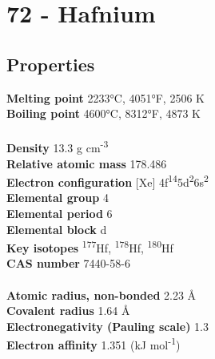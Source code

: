 \section{72 - Hafnium}
\label{sec:elem-hafnium}
\subsection{Properties}
\textbf{Melting point} 2233°C, 4051°F, 2506 K\\
\textbf{Boiling point} 4600°C, 8312°F, 4873 K\\
\\
\textbf{Density} 13.3 g cm\textsuperscript{-3}\\
\textbf{Relative atomic mass} 178.486\\
\textbf{Electron configuration} [Xe] 4f\textsuperscript{14}5d\textsuperscript{2}6s\textsuperscript{2}\\
\textbf{Elemental group} 4\\
\textbf{Elemental period} 6\\
\textbf{Elemental block} d\\
\textbf{Key isotopes} \textsuperscript{177}Hf, \textsuperscript{178}Hf, \textsuperscript{180}Hf\\
\textbf{CAS number} 7440-58-6\\
\\
\textbf{Atomic radius, non-bonded} 2.23 Å\\
\textbf{Covalent radius} 1.64 Å\\
\textbf{Electronegativity (Pauling scale)} 1.3\\
\textbf{Electron affinity} 1.351 (kJ mol\textsuperscript{-1})\\